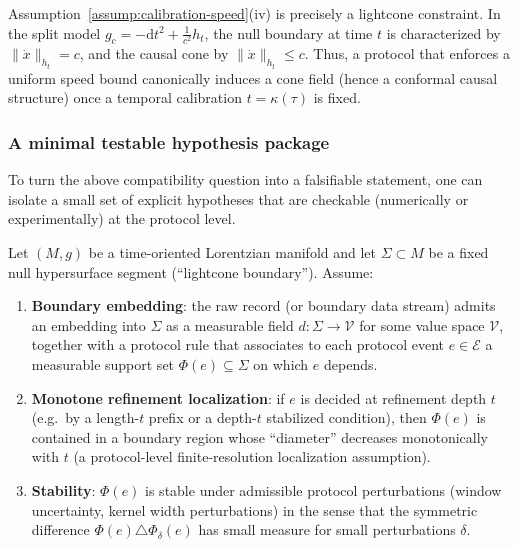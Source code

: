 \begin{remark}\label{rem:lightcone-induced}
Assumption~\ref{assump:calibration-speed}(iv) is precisely a lightcone constraint. In the split model $g_c=-\mathrm{d}t^2+\frac{1}{c^2}h_t$, the null boundary at time $t$ is characterized by $\lVert \dot x\rVert_{h_t}=c$, and the causal cone by $\lVert \dot x\rVert_{h_t}\le c$. Thus, a protocol that enforces a uniform speed bound canonically induces a cone field (hence a conformal causal structure) once a temporal calibration $t=\kappa(\tau)$ is fixed.
\end{remark}

\subsubsection{A minimal testable hypothesis package}\label{sec:causality:min-hyp}

To turn the above compatibility question into a falsifiable statement, one can isolate a small set of explicit hypotheses that are checkable (numerically or experimentally) at the protocol level.

\begin{assumption}\label{assump:phi-boundary}
Let $(M,g)$ be a time-oriented Lorentzian manifold and let $\Sigma\subset M$ be a fixed null hypersurface segment (``lightcone boundary''). Assume:
\begin{enumerate}[label=(\roman*),leftmargin=*,itemsep=2pt]
  \item \textbf{Boundary embedding}: the raw record (or boundary data stream) admits an embedding into $\Sigma$ as a measurable field $d:\Sigma\to\mathcal{V}$ for some value space $\mathcal{V}$, together with a protocol rule that associates to each protocol event $e\in\mathcal{E}$ a measurable support set $\Phi(e)\subseteq \Sigma$ on which $e$ depends.
  \item \textbf{Monotone refinement localization}: if $e$ is decided at refinement depth $t$ (e.g.\ by a length-$t$ prefix or a depth-$t$ stabilized condition), then $\Phi(e)$ is contained in a boundary region whose ``diameter'' decreases monotonically with $t$ (a protocol-level finite-resolution localization assumption).
  \item \textbf{Stability}: $\Phi(e)$ is stable under admissible protocol perturbations (window uncertainty, kernel width perturbations) in the sense that the symmetric difference $\Phi(e)\triangle \Phi_\delta(e)$ has small measure for small perturbations $\delta$.
\end{enumerate}
\end{assumption}


